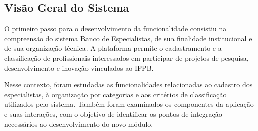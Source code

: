 \subsection{Visão Geral do Sistema}
\label{sec:arquitetura}
O primeiro passo para o desenvolvimento da funcionalidade consistiu na compreensão 
do sistema Banco de Especialistas, de sua finalidade institucional e de sua organização 
técnica. A plataforma permite o cadastramento e a classificação de profissionais 
interessados em participar de projetos de pesquisa, desenvolvimento e inovação 
vinculados ao IFPB.

Nesse contexto, foram estudadas as funcionalidades relacionadas ao cadastro dos 
especialistas, à organização por categorias e aos critérios de classificação utilizados 
pelo sistema. Também foram examinados os componentes da aplicação e suas interações, 
com o objetivo de identificar os pontos de integração necessários ao desenvolvimento do novo módulo.
